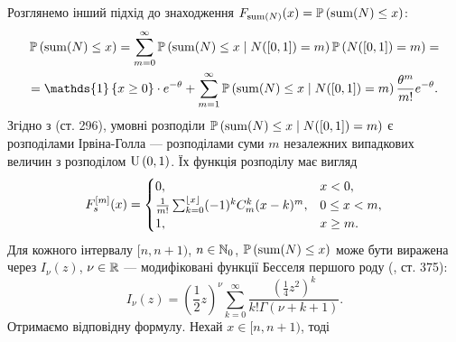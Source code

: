 Розглянемо інший підхід до знаходження $F_{\Sum(N)}(x) = \P{\Sum(N) \leq x}$:
\begin{gather*}
    \P{\Sum(N) \leq x} = 
    \sum_{m=0}^{\infty} \P{\Sum(N) \leq x \mid N([0, 1]) = m} \P{N([0, 1]) = m}
    = \\ = \mathds{1}\left\{x\geq 0\right\}\cdot e^{-\theta} +
    \sum_{m=1}^{\infty} \P{\Sum(N) \leq x \mid N([0, 1]) = m} \frac{\theta^m}{m!} e^{-\theta}.
\end{gather*}
Згідно з \cite{ContUnivDistr} (ст. 296), умовні розподіли 
$\P{\Sum(N) \leq x \mid N([0, 1]) = m}$
є розподілами Ірвіна-Голла --- розподілами 
суми $m$ незалежних випадкових величин з розподілом $\Unif{0, 1}$. Їх
функція розподілу має вигляд
\begin{gather*}
    F_s^{[m]} (x) = \begin{cases}
        0, & x < 0, \\
        \frac{1}{m!}\sum_{k=0}^{\floor*{x}} (-1)^k C_m^k (x-k)^m, & 0 \leq x < m, \\
        1, & x \geq m.
    \end{cases}
\end{gather*}
Для кожного інтервалу $[n, n+1)$, $n\in \N_0$, 
$\P{\Sum(N) \leq x}$  може бути виражена через $I_{\nu}(z)$, $\nu \in \R$  ---
модифіковані функції Бесселя першого роду (\cite{Abramowitz_Stegun}, ст. 375):
\begin{equation*}
    I_{\nu}(z) = \left(\frac{1}{2} z\right)^{\nu}
    \sum_{k=0}^{\infty} \frac{
        \left(\frac{1}{4} z^2 \right)^{k}
    }{
        k! \Gamma(\nu + k + 1)
    }.
\end{equation*}
Отримаємо відповідну формулу. Нехай $x \in [n, n+1)$, тоді
